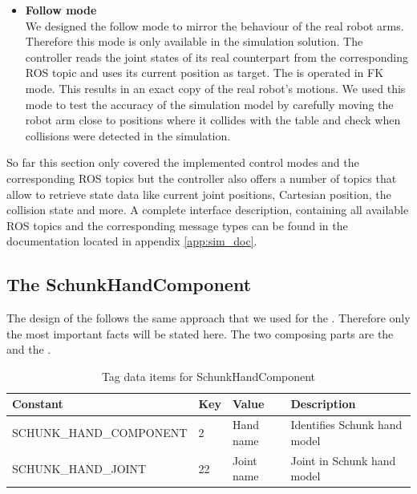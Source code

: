 \begin{itemize}
\item \textbf{Follow mode} \\
We designed the follow mode to mirror the behaviour of the real robot arms. Therefore this mode is only available in the simulation solution. The controller reads the joint states of its real counterpart from the corresponding ROS topic and uses its current position as target. The  is operated in FK mode. This results in an exact copy of the real robot's motions. We used this mode to test the accuracy of the simulation model by carefully moving the robot arm close to positions where it collides with the table and check when collisions were detected in the simulation. 

\end{itemize}

So far this section only covered the implemented control modes and the corresponding ROS topics but the controller also offers a number of topics that allow to retrieve state data like current joint positions, Cartesian position, the collision state and more. A complete interface description, containing all available ROS topics and the corresponding message types can be found in the documentation located in appendix \ref{app:sim_doc}.

\subsection{The SchunkHandComponent}

The design of the  follows the same approach that we used for the . Therefore only the most important facts will be stated here. The two composing parts are the  and the .

\begin{table}[h]
  \centering
  \begin{tabularx}{\textwidth}{|l|l|l|X|} \hline
	\textbf{Constant} & \textbf{Key} & \textbf{Value} & \textbf{Description} \\ \hline
	SCHUNK\_HAND\_COMPONENT & 2 & Hand name & Identifies Schunk hand model \\
	SCHUNK\_HAND\_JOINT & 22 & Joint name & Joint in Schunk hand model \\ \hline
  \end{tabularx}
  \caption{Tag data items for SchunkHandComponent}
  \label{fig:schunk_tags}
\end{table}


